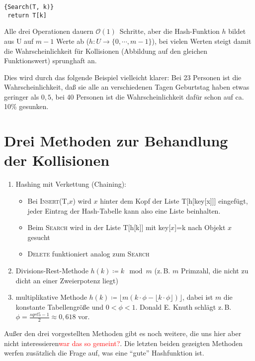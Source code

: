 \documentclass[ngerman,draft,parskip=half*,twoside]{scrreprt}
\theoremstyle{break}
\theoremstyle{nonumberbreak}
\newcommand*{\OO}{\mathcal{O}}      %
\begin{document}
\begin{Algorithmus}[H]
\begin{lstlisting}[frame=tlrb, mathescape=true, title=\textsc{Search\textnormal{(T, k)}},gobble=1]{Search(T, k)}
 return T[k]
\end{lstlisting}
\end{Algorithmus} 

Alle drei Operationen dauern $\OO(1)$~Schritte, aber
die Hash-Funktion $h$ bildet aus U auf $m-1$ Werte ab ($h: U \rightarrow \{0, \cdots, m-1\}$), bei vielen Werten steigt
damit die Wahrscheinlichkeit für Kollisionen (Abbildung auf den gleichen Funktionswert) sprunghaft an. 

Dies wird durch das folgende Beispiel vielleicht klarer: Bei 23 Personen
ist die Wahrscheinlichkeit, daß sie alle an verschiedenen Tagen Geburtstag haben etwas geringer als $0,5$, bei 40
Personen ist die Wahrscheinlichkeit dafür schon auf ca. 10\% gesunken.

\section{Drei Methoden zur Behandlung der Kollisionen}
\begin{enumerate}
\item Hashing mit Verkettung (Chaining): 
  \begin{itemize}
  \item Bei \textsc{Insert}(T,$x$) wird $x$ hinter dem Kopf der Liste T[h[key[x]]]
    eingefügt, jeder Eintrag der Hash-Tabelle kann also eine Liste beinhalten. 
  \item Beim \textsc{Search} wird in der Liste T[h[k]] mit key[$x$]=k nach Objekt $x$ gesucht
  \item \textsc{Delete} funktioniert analog zum \textsc{Search}
  \end{itemize}
\item Divisions-Rest-Methode $h(k)\coloneqq k \mod m$ (z.\,B. $m$ Primzahl, die nicht zu dicht an einer Zweierpotenz liegt)  
\item multiplikative Methode $h(k)\coloneqq \lfloor m(k \cdot \phi -\lfloor k \cdot \phi \rfloor) \rfloor$, dabei ist $m$ die
konstante Tabellengröße und $0 < \phi <1$. Donald E. Knuth schlägt z.\,B. $\phi=\frac{sqrt{5}-1}{2} \approx 0,618$ vor.
\end{enumerate} 
Außer den drei vorgestellten Methoden gibt es noch weitere, die uns hier aber nicht interessieren\textcolor{red}{war
das so gemeint?}. Die letzten beiden gezeigten Methoden werfen zusätzlich die Frage auf, was eine
"`gute"' Hashfunktion ist.
\end{document}
